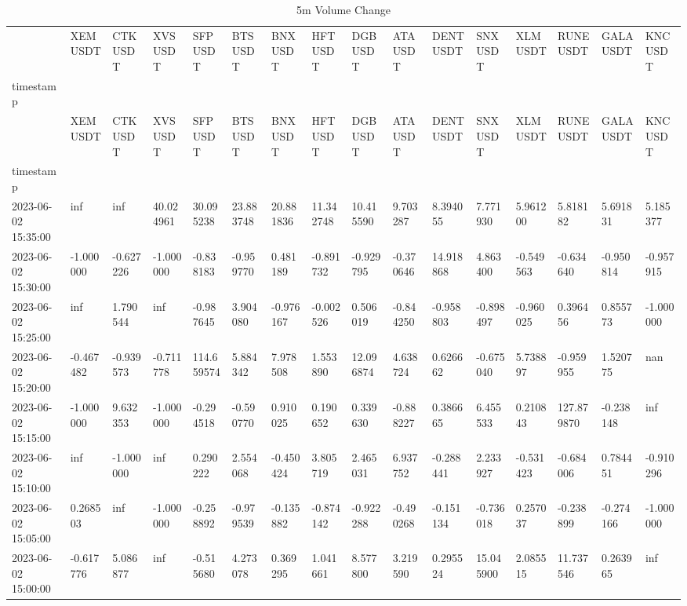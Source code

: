 \documentclass[
  letterpaper,
  DIV=11,
  numbers=noendperiod]{scrartcl}
\begin{document}
\begin{longtable}[]{@{}llllllllllllllll@{}}
\caption{5m Volume Change}\label{T_5b76b}\tabularnewline
\toprule()
~ & XEMUSDT & CTKUSDT & XVSUSDT & SFPUSDT & BTSUSDT & BNXUSDT & HFTUSDT
& DGBUSDT & ATAUSDT & DENTUSDT & SNXUSDT & XLMUSDT & RUNEUSDT & GALAUSDT
& KNCUSDT \\
timestamp & ~ & ~ & ~ & ~ & ~ & ~ & ~ & ~ & ~ & ~ & ~ & ~ & ~ & ~ & ~ \\
\midrule()
\endfirsthead
\toprule()
~ & XEMUSDT & CTKUSDT & XVSUSDT & SFPUSDT & BTSUSDT & BNXUSDT & HFTUSDT
& DGBUSDT & ATAUSDT & DENTUSDT & SNXUSDT & XLMUSDT & RUNEUSDT & GALAUSDT
& KNCUSDT \\
timestamp & ~ & ~ & ~ & ~ & ~ & ~ & ~ & ~ & ~ & ~ & ~ & ~ & ~ & ~ & ~ \\
\midrule()
\endhead
2023-06-02 15:35:00 & inf & inf & 40.024961 & 30.095238 & 23.883748 &
20.881836 & 11.342748 & 10.415590 & 9.703287 & 8.394055 & 7.771930 &
5.961200 & 5.818182 & 5.691831 & 5.185377 \\
2023-06-02 15:30:00 & -1.000000 & -0.627226 & -1.000000 & -0.838183 &
-0.959770 & 0.481189 & -0.891732 & -0.929795 & -0.370646 & 14.918868 &
4.863400 & -0.549563 & -0.634640 & -0.950814 & -0.957915 \\
2023-06-02 15:25:00 & inf & 1.790544 & inf & -0.987645 & 3.904080 &
-0.976167 & -0.002526 & 0.506019 & -0.844250 & -0.958803 & -0.898497 &
-0.960025 & 0.396456 & 0.855773 & -1.000000 \\
2023-06-02 15:20:00 & -0.467482 & -0.939573 & -0.711778 & 114.659574 &
5.884342 & 7.978508 & 1.553890 & 12.096874 & 4.638724 & 0.626662 &
-0.675040 & 5.738897 & -0.959955 & 1.520775 & nan \\
2023-06-02 15:15:00 & -1.000000 & 9.632353 & -1.000000 & -0.294518 &
-0.590770 & 0.910025 & 0.190652 & 0.339630 & -0.888227 & 0.386665 &
6.455533 & 0.210843 & 127.879870 & -0.238148 & inf \\
2023-06-02 15:10:00 & inf & -1.000000 & inf & 0.290222 & 2.554068 &
-0.450424 & 3.805719 & 2.465031 & 6.937752 & -0.288441 & 2.233927 &
-0.531423 & -0.684006 & 0.784451 & -0.910296 \\
2023-06-02 15:05:00 & 0.268503 & inf & -1.000000 & -0.258892 & -0.979539
& -0.135882 & -0.874142 & -0.922288 & -0.490268 & -0.151134 & -0.736018
& 0.257037 & -0.238899 & -0.274166 & -1.000000 \\
2023-06-02 15:00:00 & -0.617776 & 5.086877 & inf & -0.515680 & 4.273078
& 0.369295 & 1.041661 & 8.577800 & 3.219590 & 0.295524 & 15.045900 &
2.085515 & 11.737546 & 0.263965 & inf \\

\end{longtable}
\end{document}
